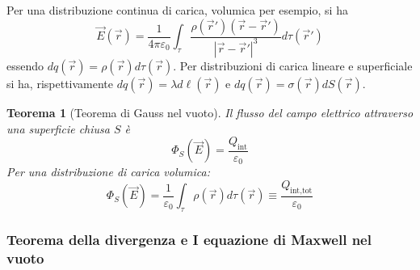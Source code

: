 \documentclass[a4paper]{scrartcl}
\numberwithin{equation}{subsection}
\theoremstyle{style1}
\newtheorem{teorema}{Teorema}[section]
\begin{document}
Per una distribuzione continua di carica, volumica per esempio, si ha
\begin{equation}
	\vec{E}(\vec{r}) =\frac{1}{4\pi \varepsilon _0} \int_{\tau } \frac{\rho (\vec{r}')(\vec{r}-\vec{r}')}{\left\lvert \vec{r} - \vec{r}' \right\rvert^3 }d\tau (\vec{r}')
\end{equation}
essendo $dq(\vec{r}) = \rho (\vec{r}) d\tau (\vec{r})$. Per distribuzioni di carica lineare e superficiale si ha, rispettivamente $dq(\vec{r})=\lambda d\ell (\vec{r})$ e $dq(\vec{r}) = \sigma (\vec{r}) dS(\vec{r})$.

\begin{teorema}
	[Teorema di Gauss nel vuoto]
	Il flusso del campo elettrico attraverso una superficie chiusa $S$ \`e 
	\begin{equation}
		\Phi _S(\vec{E}) = \frac{Q_\text{int}}{\varepsilon_0}
	\end{equation}
	Per una distribuzione di carica volumica:
\begin{equation}
	\Phi _S(\vec{E}) = \frac{1}{\varepsilon _0} \int_{\tau } \rho (\vec{r}) d\tau (\vec{r})\equiv \frac{Q_\text{int,tot}}{\varepsilon_0}
\end{equation}	
\end{teorema}
\subsubsection{Teorema della divergenza e I equazione di Maxwell nel vuoto}
\end{document}
